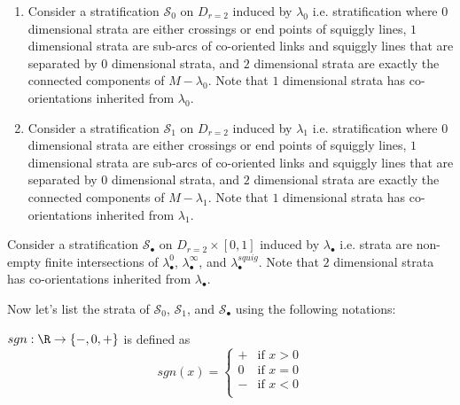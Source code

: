 \begin{definition}
\begin{enumerate}
\item Consider a stratification $\mathcal{S}_0$ on $D_{r=2}$ induced by $\lambda_0$ i.e. stratification where $0$ dimensional strata are either crossings or end points of squiggly lines, $1$ dimensional strata are sub-arcs of co-oriented links and squiggly lines that are separated by $0$ dimensional strata, and $2$ dimensional strata are exactly the connected components of $M-\lambda_0$. Note that $1$ dimensional strata has co-orientations inherited from $\lambda_0$.

\item Consider a stratification $\mathcal{S}_1$ on $D_{r=2}$ induced by $\lambda_1$ i.e. stratification where $0$ dimensional strata are either crossings or end points of squiggly lines, $1$ dimensional strata are sub-arcs of co-oriented links and squiggly lines that are separated by $0$ dimensional strata, and $2$ dimensional strata are exactly the connected components of $M-\lambda_1$. Note that $1$ dimensional strata has co-orientations inherited from $\lambda_1$.
\end{enumerate}

\item Consider a stratification $\mathcal{S}_\bullet$ on $D_{r=2}\times [0,1]$ induced by $\lambda_\bullet$ i.e. strata are non-empty finite intersections of $\lambda_\bullet^0$, $\lambda_\bullet^\infty$, and $\lambda_\bullet^{squig}$. Note that $2$ dimensional strata has co-orientations inherited from $\lambda_\bullet$.
\end{definition}

Now let's list the strata of $\mathcal{S}_0$, $\mathcal{S}_1$, and $\mathcal{S}_\bullet$ using the following notations:
\begin{definition}
$sgn : \R \rightarrow \{-,0,+ \}$ is defined as 
\[sgn(x)=\left\{
\begin{array}{ll}
    + & \text{if } x > 0 \\
    0 & \text{if } x = 0 \\
	- & \text{if } x < 0 \\
\end{array}
\right.
\]
\end{definition}

